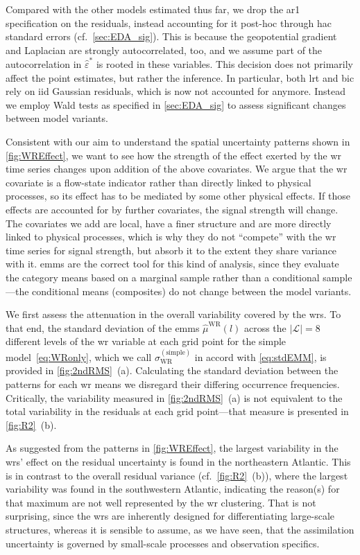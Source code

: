 Compared with the other models estimated thus far, we drop the \gls{ar1} specification on the residuals, instead accounting for it post-hoc through \gls{hac} standard errors (cf.~\cref{sec:EDA_sig}). This is because the geopotential gradient and Laplacian are strongly autocorrelated, too, and we assume part of the autocorrelation in $\hat{\varepsilon}^*$ is rooted in these variables. This decision does not primarily affect the point estimates, but rather the inference. In particular, both \gls{lrt} and \gls{bic} rely on \gls{iid} Gaussian residuals, which is now not accounted for anymore. Instead we employ Wald tests as specified in \cref{sec:EDA_sig} to assess significant changes between model variants.

Consistent with our aim to understand the spatial uncertainty patterns shown in \cref{fig:WREffect}, we want to see how the strength of the effect exerted by the \gls{wr} time series changes upon addition of the above covariates. We argue that the \gls{wr} covariate is a flow-state indicator rather than directly linked to physical processes, so its effect has to be mediated by some other physical effects. If those effects are accounted for by further covariates, the signal strength will change. The covariates we add are local, have a finer structure and are more directly linked to physical processes, which is why they do not \enquote{compete} with the \gls{wr} time series for signal strength, but absorb it to the extent they share variance with it. \glspl{emm} are the correct tool for this kind of analysis, since they evaluate the category means based on a marginal sample rather than a conditional sample---the conditional means (composites) do not change between the model variants.

We first assess the attenuation in the overall variability covered by the \glspl{wr}. To that end, the standard deviation of the \glspl{emm} $\hat{\mu}^{\mathrm{WR}}(l)$ across the $|\mathcal{L}|=8$ different levels of the \gls{wr} variable at each
grid point for the simple model~\eqref{eq:WRonly}, which we call $\sigma_{\mathrm{WR}}^{(\mathrm{simple})}$ in accord with \cref{eq:stdEMM}, is provided in \cref{fig:2ndRMS}~(a). Calculating the standard deviation between the patterns for each \gls{wr} means we disregard their differing occurrence frequencies. Critically, the variability measured in \cref{fig:2ndRMS}~(a) is not equivalent to the total variability in the residuals at each grid point---that measure is presented in \cref{fig:R2}~(b).

As suggested from the patterns in \cref{fig:WREffect}, the largest variability in the \glspl{wr}' effect on the residual uncertainty is found in the  northeastern Atlantic. This is in contrast to the overall residual variance (cf.~\cref{fig:R2}~(b)), where the largest variability was found in the southwestern Atlantic, indicating the reason(s) for that maximum are not well represented by the \gls{wr} clustering. That is not surprising, since the \glspl{wr} are inherently designed for differentiating large-scale structures, whereas it is sensible to assume, as we have seen, that the assimilation uncertainty is governed by small-scale processes and observation specifics.

